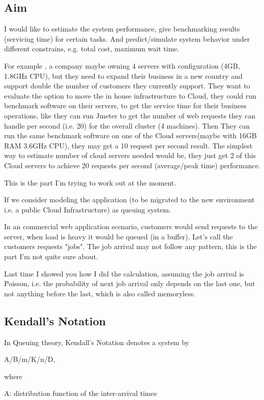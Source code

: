 \subsection{Aim}
I would like to estimate the system performance, give benchmarking results (servicing time) for certain tasks. And predict/simulate system behavior under different constrains, e.g. total cost, maximum wait time. 

For example , a company maybe owning 4 servers with configuration (4GB, 1.8GHz CPU), but they need to expand their business in a new country and support double the number of customers they currently support. They want to evaluate the option to move the in house infrastructure to Cloud, they could run benchmark software on their servers, to get the service time for their business operations, like they can run Jmeter to get the number of web requests they can handle per second (i.e. 20) for the overall cluster (4 machines). 
Then They can run the same benchmark software on one of the Cloud servers(maybe with 16GB RAM 3.6GHz CPU), they may get a 10 request per second result.
The simplest way to estimate number of cloud servers needed would be, they just get 2 of this Cloud servers to achieve 20 requests per second (average/peak time) performance.

This is the part I'm trying to work out at the moment.

If we consider modeling the application (to be migrated to the new environment i.e. a public Cloud Infrastructure) as queuing system.

In an commercial web application scenario, customers would send requests to the server, when load is heavy it would be queued (in a buffer). Let's call the customers requests "jobs".
The job arrival may not follow any pattern, this is the part I'm not quite sure about.

Last time I showed you how I did the calculation, assuming the job arrival is Poisson, i.e. the probability of next job arrival only depends on the last one, but not anything before the last, which is also called memoryless.

\subsection{Kendall’s Notation}
In Queuing theory, Kendall’s Notation denotes a system by

A/B/m/K/n/D,

where

A: distribution function of the inter-arrival times

